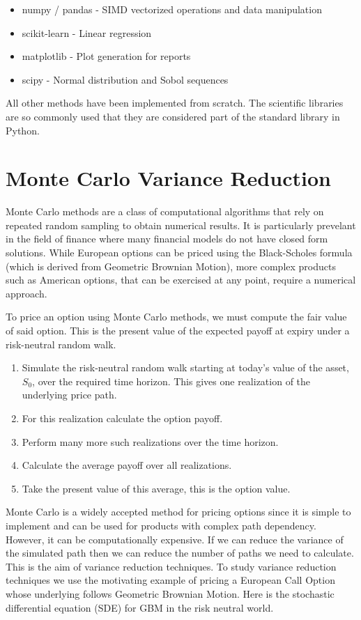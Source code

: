 \documentclass{article}
\newcommand{\para}{\vspace{8pt}} %
\begin{document}
\begin{itemize}
    \item numpy / pandas - SIMD vectorized operations and data manipulation
    \item scikit-learn - Linear regression
    \item matplotlib - Plot generation for reports
    \item scipy - Normal distribution and Sobol sequences
\end{itemize}

All other methods have been implemented from scratch. The scientific libraries are so commonly used that they are considered part of the standard library in Python.

\newpage

\section{Monte Carlo Variance Reduction}

Monte Carlo methods are a class of computational algorithms that rely on repeated random sampling to obtain numerical results. It is particularly prevelant in the field of finance
where many financial models do not have closed form solutions. While European options can be priced using the Black-Scholes formula (which is derived from Geometric Brownian Motion), more complex 
products such as American options, that can be exercised at any point, require a numerical approach. 

\para
To price an option using Monte Carlo methods, we must compute the fair value of said option. This is the present value of the expected payoff at expiry under a risk-neutral random walk. 

\begin{enumerate}
    \item Simulate the risk-neutral random walk starting at today's value of the asset, $S_0$, over the required time horizon. This gives one realization of the underlying price path.
    \item For this realization calculate the option payoff.
    \item Perform many more such realizations over the time horizon.
    \item Calculate the average payoff over all realizations.
    \item Take the present value of this average, this is the option value.
\end{enumerate}

Monte Carlo is a widely accepted method for pricing options since it is simple to implement and can be used for products with complex path dependency. However, it can be computationally expensive.  If we 
can reduce the variance of the simulated path then we can reduce the number of paths we need to calculate. This is the aim of variance reduction techniques.  To study variance reduction techniques we use 
the motivating example of pricing a European Call Option whose underlying follows Geometric Brownian Motion. Here is the stochastic differential equation (SDE) for GBM in the risk neutral world. 
\end{document}
